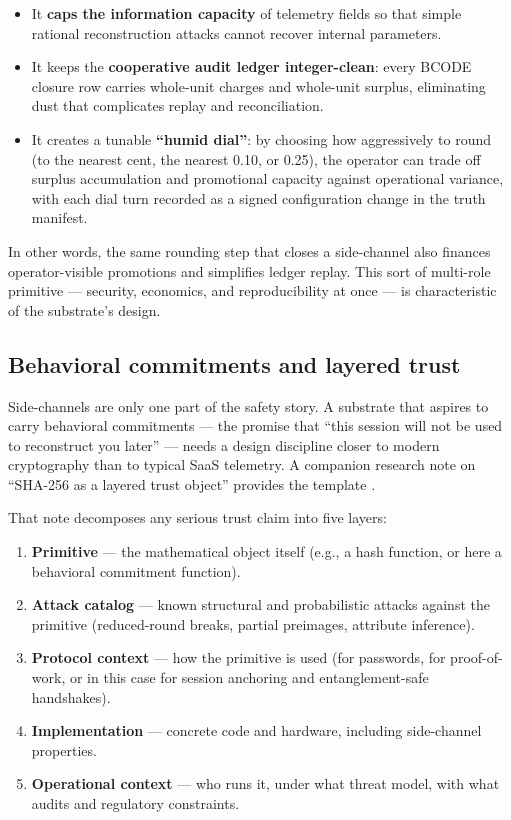 \begin{itemize}
\tightlist
\item
  It \textbf{caps the information capacity} of telemetry fields so that
  simple rational reconstruction attacks cannot recover internal
  parameters.
\item
  It keeps the \textbf{cooperative audit ledger integer-clean}: every
  BCODE closure row carries whole-unit charges and whole-unit surplus,
  eliminating dust that complicates replay and reconciliation.
\item
  It creates a tunable \textbf{``humid dial''}: by choosing how
  aggressively to round (to the nearest cent, the nearest 0.10, or
  0.25), the operator can trade off surplus accumulation and promotional
  capacity against operational variance, with each dial turn recorded as
  a signed configuration change in the truth manifest.
\end{itemize}

In other words, the same rounding step that closes a side-channel also
finances operator-visible promotions and simplifies ledger replay. This
sort of multi-role primitive --- security, economics, and
reproducibility at once --- is characteristic of the substrate's design.

\subsection{Behavioral commitments and layered
trust}\label{behavioral-commitments-and-layered-trust}

Side-channels are only one part of the safety story. A substrate that
aspires to carry behavioral commitments --- the promise that ``this
session will not be used to reconstruct you later'' --- needs a design
discipline closer to modern cryptography than to typical SaaS telemetry.
A companion research note on ``SHA-256 as a layered trust object''
provides the template \citep{wp3_sha256_layered_trust}.

That note decomposes any serious trust claim into five layers:

\begin{enumerate}
\def\labelenumi{\arabic{enumi}.}
\tightlist
\item
  \textbf{Primitive} --- the mathematical object itself (e.g., a hash
  function, or here a behavioral commitment function).
\item
  \textbf{Attack catalog} --- known structural and probabilistic attacks
  against the primitive (reduced-round breaks, partial preimages,
  attribute inference).
\item
  \textbf{Protocol context} --- how the primitive is used (for
  passwords, for proof-of-work, or in this case for session anchoring
  and entanglement-safe handshakes).
\item
  \textbf{Implementation} --- concrete code and hardware, including
  side-channel properties.
\item
  \textbf{Operational context} --- who runs it, under what threat model,
  with what audits and regulatory constraints.
\end{enumerate}

